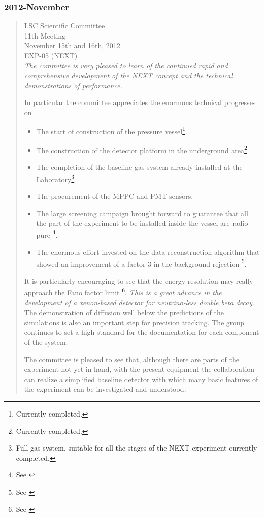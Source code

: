 \subsubsection*{2012-November}
\begin{quotation}
LSC Scientific Committee \\
11th Meeting \\
November 15th and 16th, 2012\\
EXP-05 (NEXT)\\

{\em
The committee is very pleased to learn of the continued rapid and comprehensive development of the NEXT concept and the technical demonstrations of performance. }

In particular the committee appreciates the enormous technical progresses on
\begin{itemize}
\item The start of construction of the pressure vessel\footnote{Currently completed.}.
\item The construction of the detector platform in the underground area\footnote{Currently completed.}
\item The completion of the baseline gas system already installed at the Laboratory\footnote{Full gas system, suitable for all the stages of the NEXT experiment currently completed.}
\item The procurement of the MPPC and PMT sensors.
\item The large screening campaign brought forward to guarantee that all the part of the experiment to be installed inside the vessel are radio-pure \footnote{See \cite{Cebrian:2015jna}}.
\item The enormous effort invested on the data reconstruction algorithm that showed an improvement of a factor 3 in the background rejection  \footnote{See \cite{Martin-Albo:2015rhw}}.
\end{itemize}

	
It is particularly encouraging to see that the energy resolution may really approach the Fano factor limit \footnote{See \cite{Alvarez:2012yxw}}. {\em This is a great advance in the development of a xenon-based detector for neutrino-less double beta decay}. The demonstration of diffusion well below the predictions of the simulations is also an important step for precision tracking. The group continues to set a high standard for the documentation for each component of the system. 

The committee is pleased to see that, although there are parts of the experiment not yet in hand, with the present equipment the collaboration can realize  a simplified baseline detector with which many basic features of the experiment can be investigated and understood.


\end{quotation}
